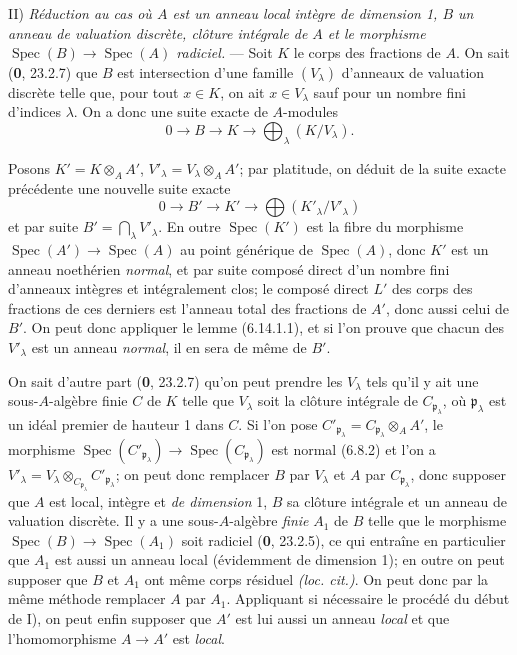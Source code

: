 II) \emph{Réduction au cas où $A$ est un anneau local intègre de dimension
1, $B$ un anneau de valuation discrète, clôture intégrale de $A$ et le
morphisme $\operatorname{Spec}(B)\to\operatorname{Spec}(A)$ radiciel.} ---
Soit $K$ le corps des fractions de $A$. On sait (\textbf{0}, 23.2.7) que $B$ est
intersection d'une famille $(V_\lambda)$ d'anneaux de valuation discrète
telle que, pour tout $x\in K$, on ait $x\in V_\lambda$ sauf pour un nombre
fini d'indices $\lambda$. On a donc une suite exacte de $A$-modules
\[
0\longrightarrow B\longrightarrow K\longrightarrow
\bigoplus_\lambda(K/V_\lambda).
\]

Posons $K'=K\otimes_A A'$, $V'_\lambda=V_\lambda\otimes_A A'$; par
platitude, on déduit de la suite exacte précédente une nouvelle suite
exacte
\[
0\longrightarrow B'\longrightarrow K'\longrightarrow
\bigoplus(K'_\lambda/V'_\lambda)
\]
et par suite $B'=\bigcap_\lambda V'_\lambda$. En outre
$\operatorname{Spec}(K')$ est la fibre du morphisme
$\operatorname{Spec}(A')\to\operatorname{Spec}(A)$ au point générique de
$\operatorname{Spec}(A)$, donc $K'$ est un anneau noethérien \emph{normal}, et par
suite composé direct d'un nombre fini d'anneaux intègres et intégralement
clos; le composé direct $L'$ des corps des fractions de ces derniers est
l'anneau total des fractions de $A'$, donc aussi celui de $B'$. On peut donc
appliquer le lemme (6.14.1.1), et si l'on prouve que chacun des
$V'_\lambda$ est un anneau \emph{normal}, il en sera de même de $B'$.

On sait d'autre part (\textbf{0}, 23.2.7) qu'on peut prendre les $V_\lambda$ tels
qu'il y ait une sous-$A$-algèbre finie $C$ de $K$ telle que $V_\lambda$
soit la clôture intégrale de $C_{\mathfrak p_\lambda}$, où
$\mathfrak p_\lambda$ est un idéal premier de hauteur 1 dans $C$. Si l'on
pose $C'_{\mathfrak p_\lambda}=C_{\mathfrak p_\lambda}\otimes_A A'$, le
morphisme $\operatorname{Spec}(C'_{\mathfrak p_\lambda})\to
\operatorname{Spec}(C_{\mathfrak p_\lambda})$ est normal (6.8.2) et l'on a
$V'_\lambda=V_\lambda\otimes_{C_{\mathfrak p_\lambda}}
C'_{\mathfrak p_\lambda}$; on peut donc remplacer $B$ par $V_\lambda$ et
$A$ par $C_{\mathfrak p_\lambda}$, donc supposer que $A$ est local, intègre
et \emph{de dimension} 1, $B$ sa clôture intégrale et un anneau de valuation
discrète. Il y a une sous-$A$-algèbre \emph{finie} $A_1$ de $B$ telle que le
morphisme $\operatorname{Spec}(B)\to\operatorname{Spec}(A_1)$ soit radiciel
(\textbf{0}, 23.2.5), ce qui entraîne en particulier que $A_1$ est aussi un anneau
local (évidemment de dimension 1); en outre on peut supposer que $B$ et
$A_1$ ont même corps résiduel \emph{(loc. cit.)}. On peut donc par la même méthode
remplacer $A$ par $A_1$. Appliquant si nécessaire le procédé du début de
I), on peut enfin supposer que $A'$ est lui aussi un anneau \emph{local} et que
l'homomorphisme $A\to A'$ est \emph{local}.

